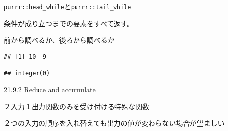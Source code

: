 \documentclass[ignorenonframetext,]{beamer}
\newenvironment{Shaded}{\begin{snugshade}}{\end{snugshade}}
\newcommand{\KeywordTok}[1]{\textcolor[rgb]{0.13,0.29,0.53}{\textbf{#1}}}
\newcommand{\DecValTok}[1]{\textcolor[rgb]{0.00,0.00,0.81}{#1}}
\newcommand{\StringTok}[1]{\textcolor[rgb]{0.31,0.60,0.02}{#1}}
\newcommand{\OperatorTok}[1]{\textcolor[rgb]{0.81,0.36,0.00}{\textbf{#1}}}
\newcommand{\NormalTok}[1]{#1}
\begin{document}
\begin{frame}[fragile]{\texttt{purrr::head\_while}と\texttt{purrr::tail\_while}}

条件が成り立つまでの要素をすべて返す。

前から調べるか、後ろから調べるか

\begin{Shaded}
\end{Shaded}

\begin{verbatim}
## [1] 10  9
\end{verbatim}

\begin{Shaded}
\end{Shaded}

\begin{verbatim}
## integer(0)
\end{verbatim}

\end{frame}

\begin{frame}{21.9.2 Reduce and accumulate}

２入力１出力関数のみを受け付ける特殊な関数

２つの入力の順序を入れ替えても出力の値が変わらない場合が望ましい

\end{frame}
\end{document}
